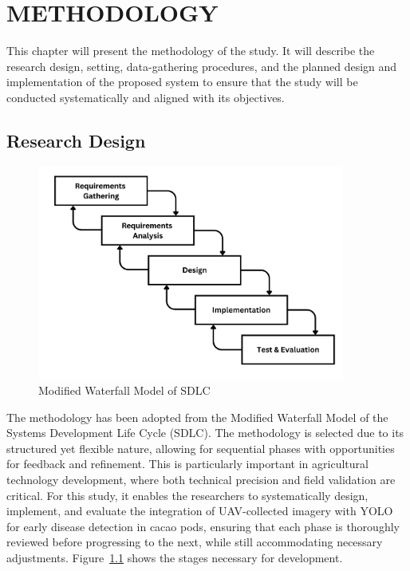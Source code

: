 \chapter{METHODOLOGY}

This chapter will present the methodology of the study. It will describe the research design, setting, data-gathering procedures, and the planned design and implementation of the proposed system to ensure that the study will be conducted systematically and aligned with its objectives.

\section{Research Design}
\begin{figure}[H]
	\centering
	\caption{Modified Waterfall Model of SDLC}
	\label{fig:waterfall}
	\includegraphics[width=0.9\textwidth]{figures/Waterfall.pdf}
\end{figure}

The methodology has been adopted from the Modified Waterfall Model of the Systems Development Life Cycle (SDLC). The methodology is selected due to its structured yet flexible nature, allowing for sequential phases with opportunities for feedback and refinement. This is particularly important in agricultural technology development, where both technical precision and field validation are critical. For this study, it enables the researchers to systematically design, implement, and evaluate the integration of UAV-collected imagery with YOLO for early disease detection in cacao pods, ensuring that each phase is thoroughly reviewed before progressing to the next, while still accommodating necessary adjustments. Figure~\ref{fig:waterfall}  shows the stages necessary for development.

